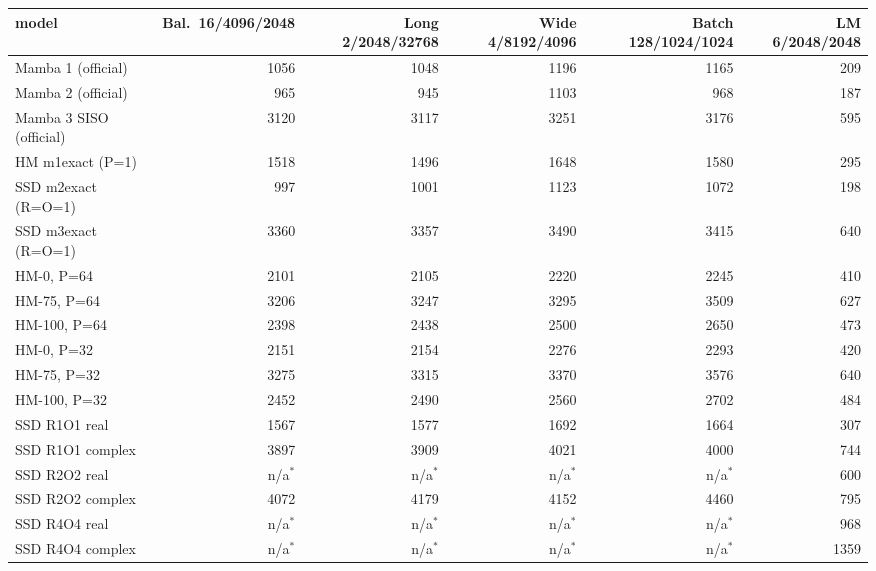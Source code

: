 \begin{tabular}{l r r r r r }
\toprule
model & Bal.\ 16/4096/2048 & Long 2/2048/32768 & Wide 4/8192/4096 & Batch 128/1024/1024 & LM 6/2048/2048 \\
\midrule
Mamba 1 (official) & 1056 & 1048 & 1196 & 1165 & 209 \\
Mamba 2 (official) & 965 & 945 & 1103 & 968 & 187 \\
Mamba 3 SISO (official) & 3120 & 3117 & 3251 & 3176 & 595 \\
HM m1exact (P=1) & 1518 & 1496 & 1648 & 1580 & 295 \\
SSD m2exact (R=O=1) & 997 & 1001 & 1123 & 1072 & 198 \\
SSD m3exact (R=O=1) & 3360 & 3357 & 3490 & 3415 & 640 \\
HM-0, P=64 & 2101 & 2105 & 2220 & 2245 & 410 \\
HM-75, P=64 & 3206 & 3247 & 3295 & 3509 & 627 \\
HM-100, P=64 & 2398 & 2438 & 2500 & 2650 & 473 \\
HM-0, P=32 & 2151 & 2154 & 2276 & 2293 & 420 \\
HM-75, P=32 & 3275 & 3315 & 3370 & 3576 & 640 \\
HM-100, P=32 & 2452 & 2490 & 2560 & 2702 & 484 \\
SSD R1O1 real & 1567 & 1577 & 1692 & 1664 & 307 \\
SSD R1O1 complex & 3897 & 3909 & 4021 & 4000 & 744 \\
SSD R2O2 real & n/a$^\ast$ & n/a$^\ast$ & n/a$^\ast$ & n/a$^\ast$ & 600 \\
SSD R2O2 complex & 4072 & 4179 & 4152 & 4460 & 795 \\
SSD R4O4 real & n/a$^\ast$ & n/a$^\ast$ & n/a$^\ast$ & n/a$^\ast$ & 968 \\
SSD R4O4 complex & n/a$^\ast$ & n/a$^\ast$ & n/a$^\ast$ & n/a$^\ast$ & 1359 \\
\bottomrule
\end{tabular}
